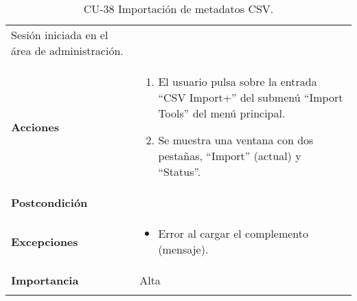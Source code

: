 \begin{longtable}[]{@{}ll@{}}
\begin{minipage}[t]{0.75\columnwidth}
Sesión iniciada en el área de administración.\strut
\end{minipage}\tabularnewline
\begin{minipage}[t]{0.20\columnwidth}\raggedright
\textbf{Acciones}\strut
\end{minipage} & \begin{minipage}[t]{0.75\columnwidth}\raggedright
\begin{enumerate}
\def\labelenumi{\arabic{enumi}.}
\tightlist
\item
  El usuario pulsa sobre la entrada ``CSV Import+'' del submenú ``Import
  Tools'' del menú principal.
\item
  Se muestra una ventana con dos pestañas, ``Import'' (actual) y ``Status''.
\end{enumerate}\strut
\end{minipage}\tabularnewline
\begin{minipage}[t]{0.20\columnwidth}\raggedright
\textbf{Postcondición}\strut
\end{minipage} & \begin{minipage}[t]{0.75\columnwidth}\raggedright
\strut
\end{minipage}\tabularnewline
\begin{minipage}[t]{0.20\columnwidth}\raggedright
\textbf{Excepciones}\strut
\end{minipage} & \begin{minipage}[t]{0.75\columnwidth}\raggedright
\begin{itemize}
\tightlist
\item
  Error al cargar el complemento (mensaje).
\end{itemize}\strut
\end{minipage}\tabularnewline
\begin{minipage}[t]{0.20\columnwidth}\raggedright
\textbf{Importancia}\strut
\end{minipage} & \begin{minipage}[t]{0.75\columnwidth}\raggedright
Alta\strut
\end{minipage}\tabularnewline
\bottomrule
\caption{CU-38 Importación de metadatos CSV.}
\end{longtable}


